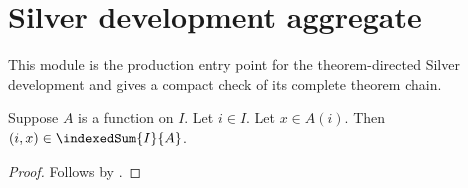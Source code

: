 \section{Silver development aggregate}











This module is the production entry point for the theorem-directed Silver
development and gives a compact check of its complete theorem chain.

\begin{proposition}\label{silver_indexed_family_smoke}
    Suppose $A$ is a function on $I$.
    Let $i\in I$.
    Let $x\in A(i)$.
    Then $(i,x)\in\indexedSum{I}{A}$.
\end{proposition}
\begin{proof}
    Follows by .
\end{proof}
